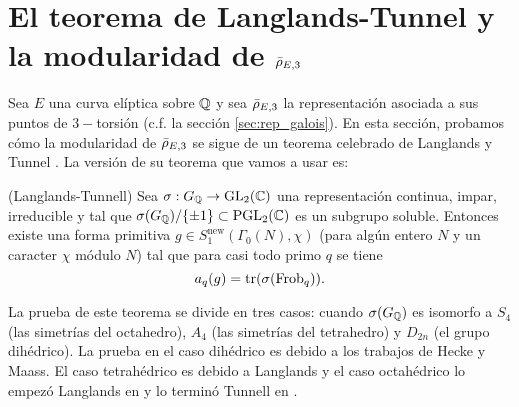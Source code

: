 \section{El teorema de Langlands-Tunnel y la modularidad de $\bar{\rho}_{E,3}$}\label{sec:langlands_tunnell}
Sea $E$ una curva el\'iptica sobre $\mathbb{Q}$ y sea $\bar{\rho}_{E,3}$ la representaci\'on asociada a sus puntos de $3-$torsi\'on (c.f. la secci\'on \ref{sec:rep_galois}). En esta secci\'on, probamos c\'omo la modularidad de $\bar{\rho}_{E,3}$ se sigue de un teorema celebrado de Langlands \cite{LanglandsBCFGL} y Tunnel \cite{TunnellACFROOT}. La versi\'on de su teorema que vamos a usar es:

\begin{thm}\label{thm:langlandstunnell}(Langlands-Tunnell)
  Sea $\sigma:G_{\mathbb{Q}}\rightarrow\mathrm{GL}_2(\mathbb{C})$ una representaci\'on continua, impar, irreducible y tal que $\sigma(G_{\mathbb{Q}})/\{\pm1\}\subset\mathrm{PGL}_2(\mathbb{C})$ es un subgrupo soluble. Entonces existe una forma primitiva $g\in S_1^{\mathrm{new}}(\Gamma_0(N),\chi)$ (para alg\'un entero $N$ y un caracter $\chi$ m\'odulo $N$) tal que para casi todo primo $q$ se tiene
  \[
    a_q(g)=\mathrm{tr}(\sigma(\mathrm{Frob}_q)).
  \]
\end{thm}

La prueba de este teorema se divide en tres casos: cuando $\sigma(G_{\mathbb{Q}})$ es isomorfo a $S_4$ (las simetr\'ias del octahedro), $A_4$ (las simetr\'ias del tetrahedro) y $D_{2n}$ (el grupo dih\'edrico). La prueba en el caso dih\'edrico es debido a los trabajos de Hecke y Maass. El caso tetrah\'edrico es debido a Langlands y el caso octah\'edrico lo empez\'o Langlands en \cite{LanglandsBCFGL} y lo termin\'o Tunnell en \cite{TunnellACFROOT}.

%
%

